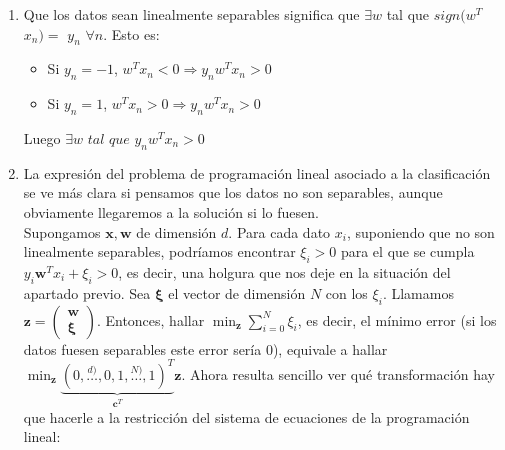 \documentclass[11pt,leqno]{article}
\theoremstyle{definition}
\begin{document}
\begin{solucion} $\ $
\begin{enumerate}[a]
\item Que los datos sean linealmente separables significa que $\exists w$ tal que $sign(w^T$ $x_n) =$ $ y_n$ $ \forall n$. Esto es:
\begin{itemize}
\item Si $y_n=-1$, $w^T x_n < 0 \Rightarrow y_n w^T x_n > 0$
\item Si $y_n= 1$, $w^T x_n > 0 \Rightarrow y_n w^T x_n > 0$
\end{itemize} 
Luego $\exists w \textit{ tal que } y_n w^T x_n > 0$

\item La expresión del problema de programación lineal asociado a la clasificación se ve más clara si pensamos que los datos no son separables, aunque obviamente llegaremos a la solución si lo fuesen.\\
Supongamos $\mathbf{x}, \mathbf{w}$ de dimensión $d$. Para cada dato $x_i$, suponiendo que no son linealmente separables, podríamos encontrar $\xi_i>0$ para el que se cumpla $y_i \mathbf{w}^T x_i + \xi_i>0$, es decir, una holgura que nos deje en la situación del apartado previo.
Sea $\mathbf{\xi}$ el vector de dimensión $N$ con los $\xi_i$. 
Llamamos $\mathbf{z} = \left( \begin{array}{c} \mathbf{w} \\ \mathbf{\xi} \end{array}\right)$. 
Entonces, hallar $\min_{\mathbf{z}} \sum_{i=0}^N \xi_i$, es decir, el mínimo error (si los datos fuesen separables este error sería 0), equivale a hallar $\min_\mathbf{z} \underbrace{(0,\overset{d)}{\dots},0,1,\overset{N)}{\dots},1)^T}_{\mathbf{c}^T} \mathbf{z}$. Ahora resulta sencillo ver qué transformación hay que hacerle a la restricción del sistema de ecuaciones de la programación lineal:


\end{enumerate}
\end{solucion}
\end{document}
